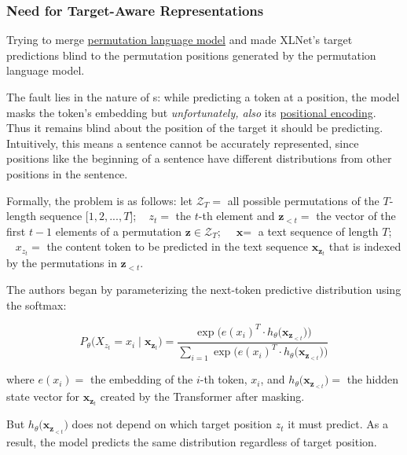 \subsubsection{Need for Target-Aware Representations}\label{sec:TargetAwarePred}

Trying to merge \hyperref[sec:permutationLM]{permutation language model} and  made XLNet's target predictions blind to the permutation positions generated by the permutation language model. 

The fault lies in the nature of s: while predicting a token at a position, the model masks the token's embedding but \emph{unfortunately, also} its \hyperref[sec:PosEncodings]{positional encoding}. Thus it remains blind about the position of the target it should be predicting. Intuitively, this means a sentence cannot be accurately represented, since positions like the beginning of a sentence have different distributions from other positions in the sentence. 

Formally, the problem is as follows: let $\mathcal{Z}_T =$ all possible permutations of the $T$-length sequence $\Big[1,2,...,T\Big]$; $\;\;\; z_t =$ the $t$-th element and $\textbf{z}_{< t} =$ the vector of the first $t-1$ elements of a permutation $\textbf{z} \in \mathcal{Z}_T$; $\;\;\; \textbf{x} =$ a text sequence of length $T$; $\;\;\; x_{z_t} =$ the content token to be predicted in the text sequence $\textbf{x}_{\textbf{z}_t}$ that is indexed by the permutations in $\textbf{z}_{< t}$. 

The authors began by parameterizing the next-token predictive distribution using the softmax: 

\begin{equation}\label{eq:predDistNoTargetAware}
P_\theta \Big( X_{z_t} = x_i\; | \; \textbf{x}_{\textbf{z}_t} \Big) = \frac{\exp {\Big( e(x_i)^T \cdot h_\theta \Big( \textbf{x}_{\textbf{z}_{< t}} \Big) \Big)}}  {\sum_{i=1} \exp{\Big( e(x_i)^T \cdot h_\theta \Big( \textbf{x}_{\textbf{z}_{< t}} \Big) \Big)}}
\end{equation}

where $e(x_i) =$ the embedding of the $i$-th token, $x_i$, and $h_\theta \Big( \textbf{x}_{\textbf{z}_{< t}} \Big) =$ the hidden state vector for $\textbf{x}_{\textbf{z}_t}$ created by the Transformer after masking. 

But $h_\theta \Big( \textbf{x}_{\textbf{z}_{< t}} \Big)$ does not depend on which target position $z_t$ it must predict. As a result, the model predicts the same distribution regardless of target position.

